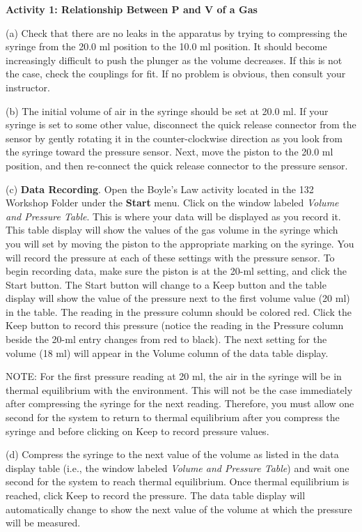 \textbf{Activity 1: Relationship Between P and V of a Gas}

(a) Check that there are no leaks in the apparatus by trying to compressing
the syringe from the 20.0 ml position to the 10.0 ml position. It should become
increasingly difficult to push the plunger as the volume decreases. If this
is not the case, check the couplings for fit. If no problem is obvious, then
consult your instructor. 
\vspace{20mm}

(b) The initial volume of air in the syringe should be set at 20.0 ml. If your
syringe is set to some other value, disconnect the quick release connector from
the sensor by gently rotating it in the counter-clockwise direction as you look
from the syringe toward the pressure sensor. Next, move the piston to the 20.0
ml position, and then re-connect the quick release connector to the pressure
sensor. 

(c) \textbf{Data Recording}. Open the Boyle's Law activity located in the 132
Workshop Folder under the {\bf Start} menu. Click on the window labeled \textit{Volume
and Pressure Table}. This is where your data will be displayed as you record
it. This table display will show the values of the gas volume in the syringe
which you will set by moving the piston to the appropriate marking on the syringe.
You will record the pressure at each of these settings with the pressure sensor.
To begin recording data, make sure the piston is at the 20-ml setting, and click
the Start button. The Start button will change to a Keep button and the table
display will show the value of the pressure next to the first volume value (20
ml) in the table. The reading in the pressure column should be colored red.
Click the Keep button to record this pressure (notice the reading in the Pressure
column beside the 20-ml entry changes from red to black). The next setting for
the volume (18 ml) will appear in the Volume column of the data table display.

NOTE: For the first pressure reading at 20 ml, the air in the syringe will be
in thermal equilibrium with the environment. This will not be the case immediately
after compressing the syringe for the next reading. Therefore, you must allow
one second for the system to return to thermal equilibrium after you compress
the syringe and before clicking on Keep to record pressure values. 

(d) Compress the syringe to the next value of the volume as listed in the data
display table (i.e., the window labeled \textit{Volume and Pressure Table})
and wait one second for the system to reach thermal equilibrium. Once thermal
equilibrium is reached, click Keep to record the pressure. The data table display
will automatically change to show the next value of the volume at which the
pressure will be measured. 

